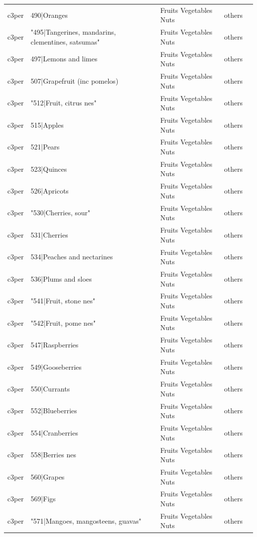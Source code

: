 \documentclass[gc, manuscript]{copernicus}
\begin{document}
\begin{table}[htbp]
\begin{tabular}{lllll}
      c3per & 490|Oranges & Fruits Vegetables Nuts & others \\ 
      c3per & "495|Tangerines, mandarins, clementines, satsumas" & Fruits Vegetables Nuts & others \\ 
      c3per & 497|Lemons and limes & Fruits Vegetables Nuts & others \\ 
      c3per & 507|Grapefruit (inc pomelos) & Fruits Vegetables Nuts & others \\ 
      c3per & "512|Fruit, citrus nes" & Fruits Vegetables Nuts & others \\ 
      c3per & 515|Apples & Fruits Vegetables Nuts & others \\ 
      c3per & 521|Pears & Fruits Vegetables Nuts & others \\ 
      c3per & 523|Quinces & Fruits Vegetables Nuts & others \\ 
      c3per & 526|Apricots & Fruits Vegetables Nuts & others \\ 
      c3per & "530|Cherries, sour" & Fruits Vegetables Nuts & others \\ 
      c3per & 531|Cherries & Fruits Vegetables Nuts & others \\ 
      c3per & 534|Peaches and nectarines & Fruits Vegetables Nuts & others \\ 
      c3per & 536|Plums and sloes & Fruits Vegetables Nuts & others \\ 
      c3per & "541|Fruit, stone nes" & Fruits Vegetables Nuts & others \\ 
      c3per & "542|Fruit, pome nes" & Fruits Vegetables Nuts & others \\ 
      c3per & 547|Raspberries & Fruits Vegetables Nuts & others \\ 
      c3per & 549|Gooseberries & Fruits Vegetables Nuts & others \\ 
      c3per & 550|Currants & Fruits Vegetables Nuts & others \\ 
      c3per & 552|Blueberries & Fruits Vegetables Nuts & others \\ 
      c3per & 554|Cranberries & Fruits Vegetables Nuts & others \\ 
      c3per & 558|Berries nes & Fruits Vegetables Nuts & others \\ 
      c3per & 560|Grapes & Fruits Vegetables Nuts & others \\ 
      c3per & 569|Figs & Fruits Vegetables Nuts & others \\ 
      c3per & "571|Mangoes, mangosteens, guavas" & Fruits Vegetables Nuts & others \\ 

\end{tabular}
\end{table}
\end{document}
